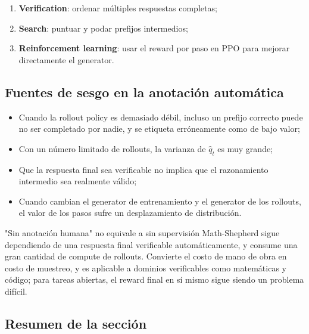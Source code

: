 \documentclass[a4paper]{article}
\begin{document}
\begin{enumerate}
    \item \textbf{Verification}: ordenar múltiples respuestas completas;
    \item \textbf{Search}: puntuar y podar prefijos intermedios;
    \item \textbf{Reinforcement learning}: usar el reward por paso en PPO para mejorar directamente el generator.
\end{enumerate}



\subsection{Fuentes de sesgo en la anotación automática}

\begin{itemize}
    \item Cuando la rollout policy es demasiado débil, incluso un prefijo correcto puede no ser completado por nadie, y se etiqueta erróneamente como de bajo valor;
    \item Con un número limitado de rollouts, la varianza de $\hat q_t$ es muy grande;
    \item Que la respuesta final sea verificable no implica que el razonamiento intermedio sea realmente válido;
    \item Cuando cambian el generator de entrenamiento y el generator de los rollouts, el valor de los pasos sufre un desplazamiento de distribución.
\end{itemize}

\begin{warningbox}{"Sin anotación humana" no equivale a sin supervisión}
Math-Shepherd sigue dependiendo de una respuesta final verificable automáticamente, y consume una gran cantidad de compute de rollouts. Convierte el costo de mano de obra en costo de muestreo, y es aplicable a dominios verificables como matemáticas y código; para tareas abiertas, el reward final en sí mismo sigue siendo un problema difícil.
\end{warningbox}

\subsection{Resumen de la sección}
\end{document}

